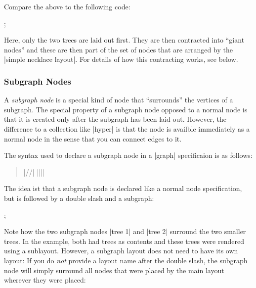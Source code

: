 Compare the above to the following code:
  
\begin{codeexample}[] 
\tikz {};
\end{codeexample}  

Here, only the two trees are laid out first. They are then
contracted into ``giant nodes'' and these are then part of the set
of nodes that are arranged by the |simple necklace layout|. For details of
how this contracting works, see below.


\subsubsection{Subgraph Nodes}

A \emph{subgraph node} is a special kind of node that ``surrounds''
the vertices of a subgraph. The special property of a subgraph node
opposed to a normal node is that it is created only after the subgraph
has been laid out. However, the difference to a collection like
|hyper| is that the node is availble immediately as a normal node in
the sense that you can connect edges to it.

The syntax used to declare a subgraph node in a |graph| specificaion
is as follows:

\begin{quote}
  |//|  |{||}|
\end{quote}

The idea ist that a subgraph node is declared like a normal node
specification, but is followed by a double slash and a subgraph:

\begin{codeexample}[width=5cm] 
\tikz {};
\end{codeexample}  

Note how the two subgraph nodes |tree 1| and |tree 2| surround the two
smaller trees. In the example, both had trees as contents and these
trees were rendered using a sublayout. However, a subgraph layout does
not need to have its own layout: If you do \emph{not} provide a layout
name after the double slash, the subgraph node will simply surround
all nodes that were placed by the main layout wherever they were
placed:

